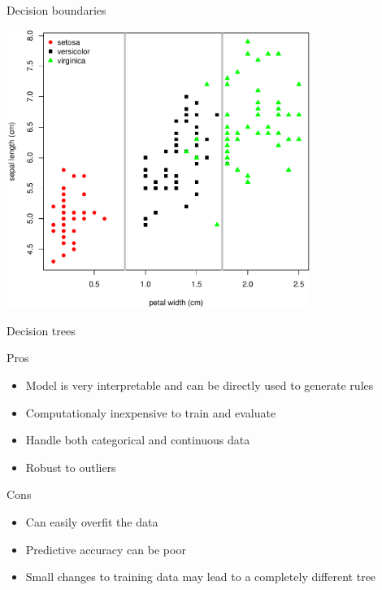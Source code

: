 \documentclass[pdf]{beamer}
\begin{document}
\begin{frame}{Decision boundaries}
\begin{center}
	\includegraphics[width=0.74\textwidth]{irisPlotBound.pdf}
\end{center}
\end{frame}
\begin{frame}{Decision trees}
\begin{exampleblock}{Pros}
\begin{itemize}
	\item Model is very interpretable and can be directly used to generate rules
	\item Computationaly inexpensive to train and evaluate 
	\item Handle both categorical and continuous data
	\item Robust to outliers
\end{itemize}
\end{exampleblock}
\vfill
\begin{alertblock}{Cons}
\begin{itemize}
	\item Can easily overfit the data
	\item Predictive accuracy can be poor
	\item Small changes to training data may lead to a completely different tree
\end{itemize}
\end{alertblock}
\end{frame}
\end{document}
